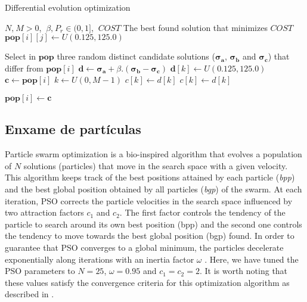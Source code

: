 \begin{algorithm}[ht]
\caption{Differential evolution optimization}
\label{alg:de}
\begin{algorithmic}
\Require $N\text{,}\:M > 0$, $\:\beta\text{,}\:P_r \in (0,1]$, $\:COST$
\Ensure The best found solution that minimizes $COST$
\State $\boldsymbol{pop}[i][j] \gets U(0.125,125.0)$
\EndFor
\EndFor

\State Select in $\boldsymbol{pop}$ three random distinct candidate solutions ($\boldsymbol{\sigma_a}$, $\boldsymbol{\sigma_b}$ and $\boldsymbol{\sigma_c}$) that differ from $\boldsymbol{pop}[i]$
\State $\boldsymbol{d} \gets \boldsymbol{\sigma_a} + \beta.(\boldsymbol{\sigma_b} - \boldsymbol{\sigma_c})$
\State $\boldsymbol{d}[k] \gets U(0.125,125.0)$
\EndIf
\EndFor
\State $\boldsymbol{c} \gets \boldsymbol{pop}[i]$
\State $k \gets U(0,M-1)$
\State $c[k] \gets d[k]$
  \State $c[k] \gets d[k]$
\EndIf
\EndFor

 \State $\boldsymbol{pop}[i] \gets \boldsymbol{c}$
\EndIf
\EndFor
\EndFor
\end{algorithmic}
\end{algorithm}

\subsection{Enxame de partículas}

Particle swarm optimization is a bio-inspired algorithm that evolves a population of $N$ solutions (particles) that move in the search space with a given velocity. This algorithm keeps track of the best positions attained by each particle (\emph{bpp}) and the best global position obtained by all particles (\emph{bgp}) of the swarm.  At each iteration, PSO corrects the particle velocities in the search space influenced by two attraction factors $c_1$ and $c_2$. The first factor  controls the tendency of the particle to search around its own best position (bpp) and the second one controls the tendency to move towards the best global position (bgp) found.  In order to guarantee that PSO converges to a global minimum, the particles decelerate exponentially along iterations with an inertia factor $\omega$ \cite{Yuhui:1998}. Here,  we have tuned the PSO parameters to $N = 25$, $\omega = 0.95$ and $c_1 = c_2 = 2$. It is worth noting that these values satisfy the convergence criteria for this optimization algorithm as described in \cite{Jiang20078}.

